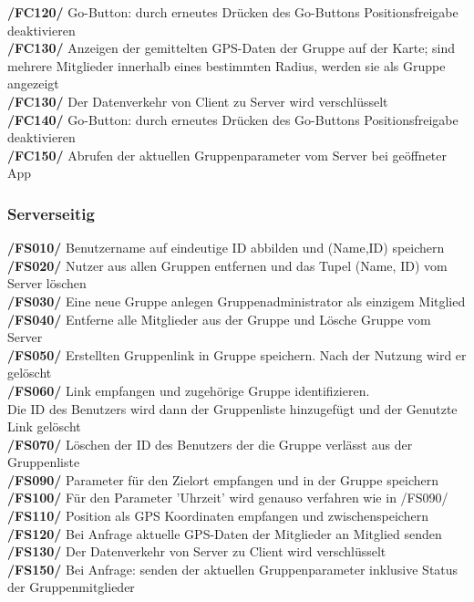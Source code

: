      \textbf{/FC120/} Go-Button: durch erneutes Drücken des Go-Buttons Positionsfreigabe deaktivieren\\
     \textbf{/FC130/} Anzeigen der gemittelten GPS-Daten der Gruppe auf der Karte; sind mehrere Mitglieder innerhalb eines bestimmten Radius,
     werden sie als Gruppe angezeigt\\
     \textbf{/FC130/} Der Datenverkehr von Client zu Server wird verschlüsselt\\
     \textbf{/FC140/} Go-Button: durch erneutes Drücken des Go-Buttons Positionsfreigabe deaktivieren\\
     \textbf{/FC150/} Abrufen der aktuellen Gruppenparameter vom Server bei geöffneter App\\
\subsubsection{Serverseitig}
     \textbf{/FS010/} Benutzername auf eindeutige ID abbilden und (Name,ID) speichern\\
     \textbf{/FS020/} Nutzer aus allen Gruppen entfernen und das Tupel (Name, ID) vom Server löschen \\
     \textbf{/FS030/} Eine neue Gruppe anlegen Gruppenadministrator als einzigem Mitglied\\
     \textbf{/FS040/} Entferne alle Mitglieder aus der Gruppe und Lösche Gruppe vom Server\\
     \textbf{/FS050/} Erstellten Gruppenlink in Gruppe speichern. Nach der Nutzung wird er gelöscht\\
     \textbf{/FS060/} Link empfangen und zugehörige Gruppe identifizieren.\\ Die ID des Benutzers wird dann der Gruppenliste hinzugefügt und der Genutzte Link gelöscht\\
     \textbf{/FS070/} Löschen der ID des Benutzers der die Gruppe verlässt aus der Gruppenliste\\
     \textbf{/FS090/} Parameter für den Zielort empfangen und in der Gruppe speichern\\
     \textbf{/FS100/} Für den Parameter 'Uhrzeit' wird genauso verfahren wie in /FS090/ \\
     \textbf{/FS110/} Position als GPS Koordinaten empfangen und zwischenspeichern\\
     \textbf{/FS120/} Bei Anfrage aktuelle GPS-Daten der Mitglieder an Mitglied senden \\
     \textbf{/FS130/} Der Datenverkehr von Server zu Client wird verschlüsselt\\
     \textbf{/FS150/} Bei Anfrage: senden der aktuellen Gruppenparameter inklusive Status der Gruppenmitglieder\\
